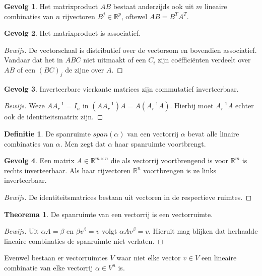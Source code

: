 \documentclass{amsart}
\theoremstyle{definition}
\newtheorem{thm}{Theorema}[section]
\newtheorem{dfn}{Definitie}[section]
\newtheorem{csq}{Gevolg}[section]
\newcommand{\realnums}{\mathbb{R}}
\newcommand{\realn}[1][n]{\realnums^{#1}}
\newcommand{\realmx}[2][n]{\realn[#2 \times #1]}
\newcommand{\realmxn}{\realmx{m}}
\newenvironment{bewijs}{\begin{proof}[Bewijs]}{\end{proof}}
\begin{document}
\begin{csq}
	Het matrixproduct $AB$ bestaat anderzijds ook uit $m$ lineaire combinaties van $n$ rijvectoren $B^j \in \realn[p]$, oftewel $AB = B^TA^T$.
\end{csq}

\begin{csq}
	Het matrixproduct is associatief.
	\begin{bewijs}
		De vectorschaal is distributief over de vectorsom en bovendien associatief.
		Vandaar dat het in $ABC$ niet uitmaakt of een $C_i$ zijn coëfficiënten verdeelt over $AB$ of een $(BC)_j$ de zijne over $A$.
	\end{bewijs}
\end{csq}

\begin{csq}
	Inverteerbare vierkante matrices zijn commutatief inverteerbaar.
	\begin{bewijs}
		Weze $AA^{-1}_r = I_n$ in $(AA^{-1}_r)A = A(A^{-1}_rA)$. Hierbij moet $A^{-1}_rA$ echter ook de identiteitsmatrix zijn.
	\end{bewijs}
\end{csq}

\begin{dfn}
	De spanruimte $span(\alpha)$ van een vectorrij $\alpha$ bevat alle linaire combinaties van $\alpha$.
	Men zegt dat $\alpha$ haar spanruimte voortbrengt.
\end{dfn}

\begin{csq}
	Een matrix $A \in \realmxn$ die als vectorrij voortbrengend is voor $\realn[m]$ is rechts inverteerbaar.
	Als haar rijvectoren $\realn$ voortbrengen is ze links inverteerbaar.
	\begin{bewijs}
		De identiteitsmatrices bestaan uit vectoren in de respectieve ruimtes.
	\end{bewijs}
\end{csq}

\begin{thm}
	De spanruimte van een vectorrij is een vectorruimte.
	\begin{bewijs}
		Uit $\alpha A = \beta$ en $\beta v^\beta = v$ volgt $\alpha A v^\beta = v$.
		Hieruit mag blijken dat herhaalde lineaire combinaties de spanruimte niet verlaten.
	\end{bewijs}
\end{thm}

Evenwel bestaan er vectorruimtes $V$ waar niet elke vector $v \in V$ een lineaire combinatie van elke vectorrij $\alpha \in V^n$ is.
\end{document}
